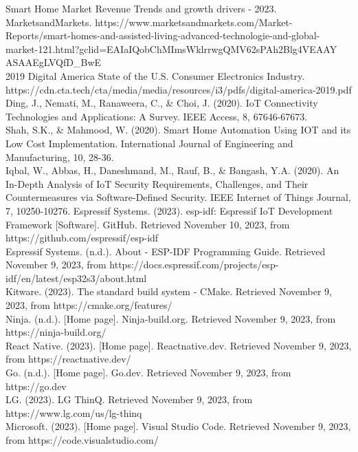 \documentclass[conference]{IEEEtran}
\begin{document}
\begin{thebibliography}{00}
 Smart Home Market Revenue Trends and growth drivers - 2023. MarketsandMarkets. https://www.marketsandmarkets.com/Market-Reports/smart-homes-and-assisted-living-advanced-technologie-and-global-market-121.html?gclid=EAIaIQobChMImsWklrrwgQMV62sPAh2Blg4VEAAY\\ASAAEgLVQfD\_BwE \\
 2019 Digital America State of the U.S. Consumer Electronics Industry. https://cdn.cta.tech/cta/media/media/resources/i3/pdfs/digital-america-2019.pdf \\
 Ding, J., Nemati, M., Ranaweera, C., \& Choi, J. (2020). IoT Connectivity Technologies and Applications: A Survey. IEEE Access, 8, 67646-67673.\\
 Shah, S.K., \& Mahmood, W. (2020). Smart Home Automation Using IOT and its Low Cost Implementation. International Journal of Engineering and Manufacturing, 10, 28-36.\\
 Iqbal, W., Abbas, H., Daneshmand, M., Rauf, B., \& Bangash, Y.A. (2020). An In-Depth Analysis of IoT Security Requirements, Challenges, and Their Countermeasures via Software-Defined Security. IEEE Internet of Things Journal, 7, 10250-10276.
 Espressif Systems. (2023). esp-idf: Espressif IoT Development Framework [Software]. GitHub. Retrieved November 10, 2023, from https://github.com/espressif/esp-idf\\
 Espressif Systems. (n.d.). About - ESP-IDF Programming Guide. Retrieved November 9, 2023, from https://docs.espressif.com/projects/esp-idf/en/latest/esp32s3/about.html\\
 Kitware. (2023). The standard build system - CMake. Retrieved November 9, 2023, from https://cmake.org/features/\\
 Ninja. (n.d.). [Home page]. Ninja-build.org. Retrieved November 9, 2023, from https://ninja-build.org/\\
 React Native. (2023). [Home page]. Reactnative.dev. Retrieved November 9, 2023, from https://reactnative.dev/\\
 Go. (n.d.). [Home page]. Go.dev. Retrieved November 9, 2023, from https://go.dev\\
 LG. (2023). LG ThinQ. Retrieved November 9, 2023, from https://www.lg.com/us/lg-thinq\\
 Microsoft. (2023). [Home page]. Visual Studio Code. Retrieved November 9, 2023, from https://code.visualstudio.com/\\
\end{thebibliography}
\end{document}

